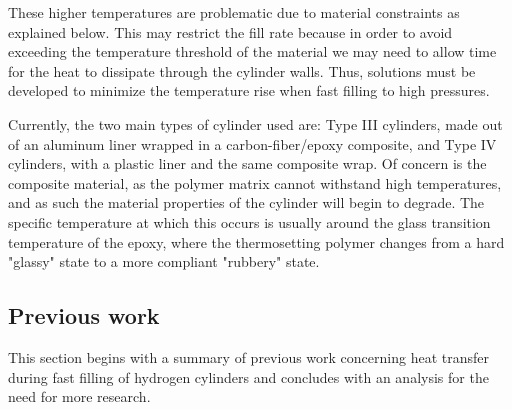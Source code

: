  
These higher temperatures are problematic due to material constraints as explained below. This may restrict the fill rate because in order to avoid exceeding the temperature threshold of the material we may need to allow time for the heat to dissipate through the cylinder walls.
 Thus, solutions must be developed to minimize the temperature rise when fast filling to high pressures.




 
Currently, the two main types of cylinder used are: Type III cylinders, made out of an aluminum liner wrapped in a carbon-fiber/epoxy composite, and Type IV cylinders, with a plastic liner and the same composite wrap. Of concern is the composite material, as the polymer matrix cannot withstand high temperatures, and as such the material properties of the cylinder will begin to degrade. The specific temperature at which this occurs is usually around the glass transition temperature of the epoxy, where the thermosetting polymer changes from a hard "glassy" state to a more compliant "rubbery" state.  

\subsection{Previous work}

This section begins with  a summary of previous work concerning heat transfer during fast filling of hydrogen cylinders and concludes with an analysis for the need for more research. 



